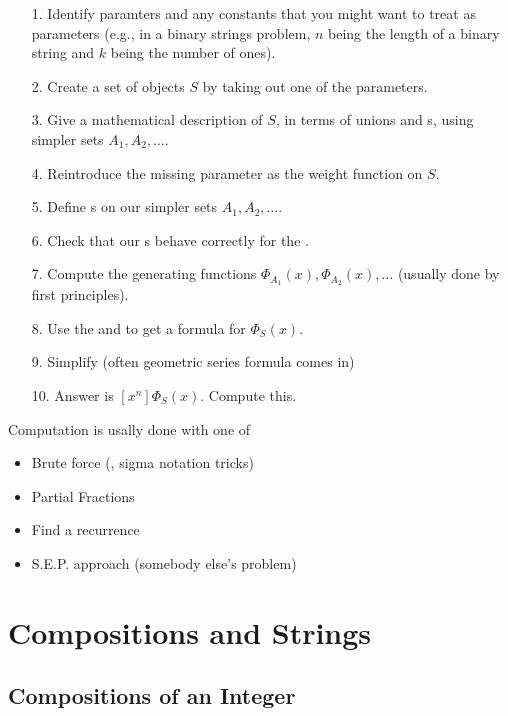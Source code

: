 \documentclass[english, 11pt]{article}
\begin{document}
  \begin{itemize}
    \item[1.] Identify paramters and any constants that you might want to treat as parameters (e.g., in a binary strings problem, $n$ being the length of a binary string and $k$ being the number of ones).
    \item[2.] Create a set of objects $S$ by taking out one of the parameters.
    \item[3.] Give a mathematical description of $S$, in terms of unions and s, using simpler sets $A_1, A_2, \ldots$.
    \item[4.] Reintroduce the missing parameter as the weight function on $S$.
    \item[5.] Define s on our simpler sets $A_1, A_2, \ldots$.
    \item[6.] Check that our s behave correctly for the .
    \item[7.] Compute the generating functions $\Phi_{A_1}(x), \Phi_{A_2}(x), \ldots$ (usually done by first principles).
    \item[8.] Use the  and  to get a formula for $\Phi_S(x)$.
    \item[9.] Simplify (often geometric series formula comes in)
    \item[10.] Answer is $[x^n]\Phi_S(x)$. Compute this.
  \end{itemize}

  Computation is usally done with one of
  \begin{itemize}
    \item Brute force (, sigma notation tricks)
    \item Partial Fractions
    \item Find a recurrence
    \item S.E.P. approach (somebody else's problem)
  \end{itemize}

  \section{Compositions and Strings}

  \subsection{Compositions of an Integer}
\end{document}
